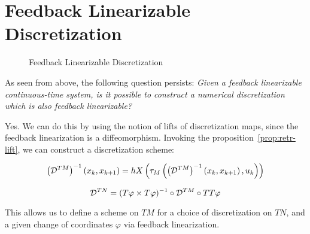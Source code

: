 \section{Feedback Linearizable Discretization}


\begin{figure}[h]
    \centering
    \caption{Feedback Linearizable Discretization}
\end{figure}

As seen from above, the following question persists: \textsl{Given a feedback linearizable continuous-time system, is it possible to construct a numerical discretization which is also feedback linearizable?}

Yes. We can do this by using the notion of lifts of discretization maps, since the feedback linearization is a diffeomorphism. Invoking the proposition~\eqref{prop:retr-lift}, we can construct a discretization scheme:

\begin{equation}
    \left(\mathcal{D}^{TM}\right)^{-1}(x_k, x_{k+1}) = hX \left( \tau_M \left( \left( \mathcal{D}^{TM} \right)^{-1} \left( x_k, x_{k+1}\right), u_k  \right) \right) 
\end{equation}

\begin{equation}
    \mathcal{D}^{TN} = (T\varphi \times T \varphi)^{-1} \circ \mathcal{D}^{TM} \circ TT \varphi
\end{equation}

This allows us to define a scheme on $TM$ for a choice of discretization on $TN$, and a given change of coordinates $\varphi$ via feedback linearization.


